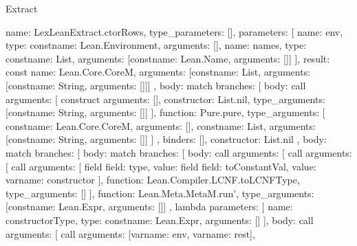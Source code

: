 \begin{lexlean}{Extract}
\begin{toolingmodule}
{{      name: LexLeanExtract.ctorRows,
      type_parameters: [],
      parameters: [
        {name: env, type: const{name: Lean.Environment, arguments: []}},
        {name: names, type: const{name: List, arguments: [const{name: Lean.Name, arguments: []}]}}
      ],
      result: const{
        name: Lean.Core.CoreM,
        arguments: [const{name: List, arguments: [const{name: String, arguments: []}]}]
      },
      body: match{
        branches: [
          {
            body: call{
              arguments: [
                construct{
                  arguments: [],
                  constructor: List.nil,
                  type_arguments: [const{name: String, arguments: []}]
                }
              ],
              function: Pure.pure,
              type_arguments: [
                const{name: Lean.Core.CoreM, arguments: []},
                const{name: List, arguments: [const{name: String, arguments: []}]}
              ]
            },
            binders: [],
            constructor: List.nil
          },
          {
            body: match{
              branches: [
                {
                  body: match{
                    branches: [
                      {
                        body: call{
                          arguments: [
                            call{
                              arguments: [
                                call{
                                  arguments: [
                                    field{
                                      field: type,
                                      value: field{
                                        field: toConstantVal,
                                        value: var{name: constructor}
                                      }
                                    }
                                  ],
                                  function: Lean.Compiler.LCNF.toLCNFType,
                                  type_arguments: []
                                }
                              ],
                              function: Lean.Meta.MetaM.run',
                              type_arguments: [const{name: Lean.Expr, arguments: []}]
                            },
                            lambda{
                              parameters: [
                                {name: constructorType, type: const{name: Lean.Expr, arguments: []}}
                              ],
                              body: call{
                                arguments: [
                                  call{
                                    arguments: [var{name: env}, var{name: rest}],
}}}}}}}}}}}}
\end{toolingmodule}
\end{lexlean}
